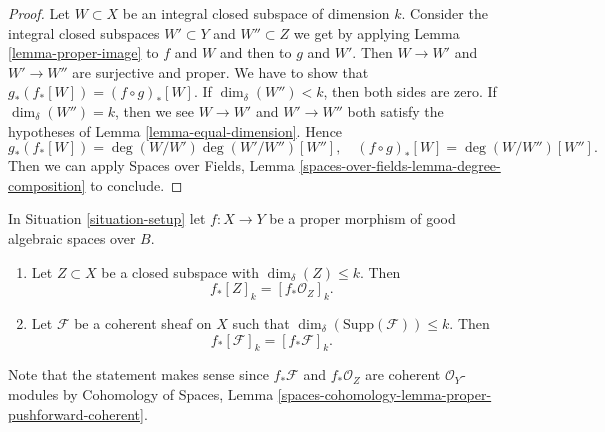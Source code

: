 \begin{proof}
Let $W \subset X$ be an integral closed subspace of dimension $k$.
Consider the integral closed subspaces
$W' \subset Y$ and $W'' \subset Z$
we get by applying Lemma \ref{lemma-proper-image}
to $f$ and $W$ and then to $g$ and $W'$.
Then $W \to W'$ and $W' \to W''$ are surjective and proper.
We have to show that $g_*(f_*[W]) = (f \circ g)_*[W]$.
If $\dim_\delta(W'') < k$, then both sides are zero.
If $\dim_\delta(W'') = k$, then we see $W \to W'$ and $W' \to W''$
both satisfy the hypotheses of Lemma \ref{lemma-equal-dimension}.
Hence
$$
g_*(f_*[W]) = \deg(W/W')\deg(W'/W'')[W''],
\quad
(f \circ g)_*[W] = \deg(W/W'')[W''].
$$
Then we can apply
Spaces over Fields, Lemma \ref{spaces-over-fields-lemma-degree-composition}
to conclude.
\end{proof}

\begin{lemma}
\label{lemma-cycle-push-sheaf}
In Situation \ref{situation-setup} let $f : X \to Y$ be a proper morphism
of good algebraic spaces over $B$.
\begin{enumerate}
\item Let $Z \subset X$ be a closed subspace with $\dim_\delta(Z) \leq k$.
Then
$$
f_*[Z]_k = [f_*{\mathcal O}_Z]_k.
$$
\item Let $\mathcal{F}$ be a coherent sheaf on $X$ such that
$\dim_\delta(\text{Supp}(\mathcal{F})) \leq k$. Then
$$
f_*[\mathcal{F}]_k = [f_*{\mathcal F}]_k.
$$
\end{enumerate}
Note that the statement makes sense since $f_*\mathcal{F}$ and
$f_*\mathcal{O}_Z$ are coherent $\mathcal{O}_Y$-modules by
Cohomology of Spaces, Lemma
\ref{spaces-cohomology-lemma-proper-pushforward-coherent}.
\end{lemma}

